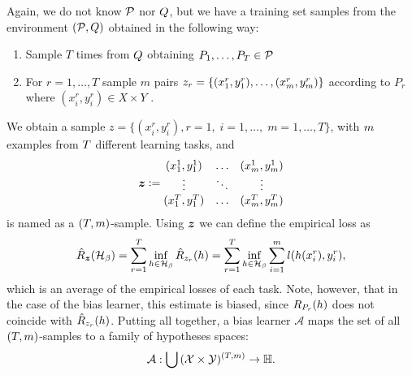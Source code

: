 Again, we do not know $\mathcal{P}$ nor $Q$, but we have a training set samples from the environment $(\mathcal{P}, Q)$ obtained in the following way:
\begin{enumerate}
    \item Sample $T$ times from $Q$ obtaining $P_1, \ldots, P_T \in \mathcal{P}$
    \item For $r=1, \ldots, T$ sample $m$ pairs $z_r = \{(x_1^r, y_1^r), \ldots, (x_m^r, y_m^r)\}$ according to $P_r$ where $(x_i^r, y_i^r) \in X \times Y$ .
\end{enumerate}
We obtain a sample $z=\{(x_i^r, y_i^r), r=1,\; i=1, \ldots, \;m=1, \ldots, T\}$, with $m$ examples from $T$ different learning tasks, and
\begin{equation}
    \nonumber
    \bm{z} \vcentcolon= 
    \begin{matrix}
        (x_1^1, y_1^1) & \ldots & (x_m^1, y_m^1) \\
        \vdots & \ddots & \vdots \\
        (x_1^T, y_1^T) & \ldots & (x_m^T, y_m^T) \\
    \end{matrix}
\end{equation}
is named as a $(T, m)$-sample.
Using $\bm{z}$ we can define the empirical loss as
\begin{equation}\label{eq:biaslearn_emprisk}
    \bemprisk(\hypspace_\fparam) = \sum_{r=1}^\ntasks \inf_{\hypf \in \hypspace_\fparam} \hat{\risk}_{\sample_r}(\hypf) = \sum_{r=1}^\ntasks \inf_{\hypf \in \hypspace_\fparam} \sum_{i=1}^m l(\hypf(x_i^r), y_i^r),
\end{equation}
which is an average of the empirical losses of each task. 
Note, however, that in the case of the bias learner, this estimate is biased, since $R_{P_r}(h)$ does not coincide with $\hat{R}_{z_r}(h)$. 
Putting all together, a bias learner $\mathcal{A}$ maps the set of all $(T, m)$-samples to a family of hypotheses spaces:
\begin{equation}
    \nonumber
    \mathcal{A} : \bigcup {(\mathcal{X}\times \mathcal{Y})^{(T, m)}} \to \mathbb{H}.
\end{equation}
%

